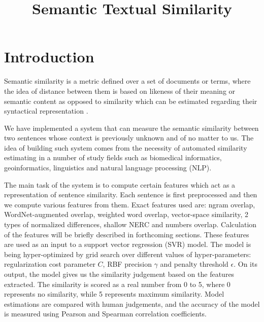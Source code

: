 \documentclass[10pt, a4paper]{article}
\title{Semantic Textual Similarity}
\begin{document}
\maketitleabstract

\section{Introduction}



Semantic similarity is a metric defined over a set of documents or terms, where the idea of distance between them is based on likeness of their meaning or semantic content as opposed to similarity which can be estimated regarding their syntactical representation \citep{wiki_semantic}.

We have implemented a system that can measure the semantic similarity between two sentences whose context is previously unknown and of no matter to us. The idea of building such system comes from the necessity of automated similarity estimating in a number of study fields such as biomedical informatics, geoinformatics, linguistics and natural language processing (NLP).

The main task of the system is to compute certain features which act as a representation of sentence similarity. Each sentence is first preprocessed and then we compute various features from them. Exact features used are: ngram overlap, WordNet-augmented overlap, weighted word overlap, vector-space similarity, 2 types of normalized differences, shallow NERC and numbers overlap. Calculation of the features will be briefly described in forthcoming sections. These features are used as an input to a support vector regression (SVR) model. The model is being hyper-optimized by grid search over different values of hyper-parameters: regularization cost parameter $C$, RBF precision $\gamma$ and penalty threshold $\epsilon$. On its output, the model gives us the similarity judgement based on the features extracted. The similarity is scored as a real number from 0 to 5, where 0 represents no similarity, while 5 represents maximum similarity. Model estimations are compared with human judgements, and the accuracy of the model is measured using Pearson and Spearman correlation coefficients.
\end{document}
